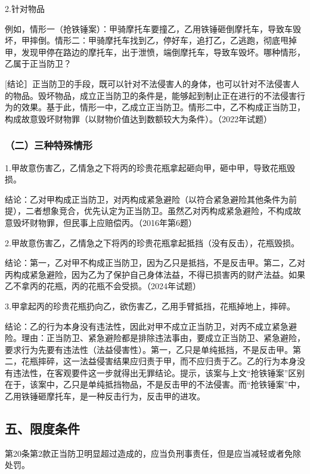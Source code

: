 2.针对物品

例如，情形一（抢铁锤案）：甲骑摩托车要撞乙，乙用铁锤砸倒摩托车，导致车毁坏，甲摔倒。情形二：甲骑摩托车找到乙，停好车，追打乙，乙逃跑，彻底甩掉甲，发现甲停在路边的摩托车，出于泄愤，端倒摩托车，导致车毁坏。哪种情形，乙属于正当防卫？

[结论］正当防卫的手段，既可以针对不法侵害人的身体，也可以针对不法侵害人的物品。毁坏物品，成立正当防卫的条件是，能够起到制止正在进行的不法侵害行为的效果。基于此，情形一中，乙成立正当防卫。情形二中，乙不构成正当防卫，构成故意毁坏财物罪（以财物价值达到数额较大为条件）。（2022年试题）

\subsubsection*{（二）三种特殊情形}

1.甲故意伤害乙，乙情急之下将丙的珍贵花瓶拿起砸向甲，砸中甲，导致花瓶毁损。

结论：乙对甲构成正当防卫，对丙构成紧急避险（以符合紧急避险其他条件为前提），二者想象竞合，优先认定为正当防卫。虽然乙对丙构成紧急避险，不构成故意毁坏财物罪，但民事上应赔偿丙。（2016年第6题）

2.甲故意伤害乙，乙情急之下将丙的珍贵花瓶拿起抵挡（没有反击），花瓶毁损。

结论：第一，乙对甲不构成正当防卫，因为乙只是抵挡，不是反击甲。第二，乙对丙构成紧急避险，因为乙为了保护自己身体法益，不得已损害丙的财产法益。如果乙不拿丙的花瓶，丙的花瓶不会受损。（2024年试题）

3.甲拿起丙的珍贵花瓶扔向乙，欲伤害乙，乙用手臂抵挡，花瓶掉地上，摔碎。

结论：乙的行为本身没有违法性，因此对甲不成立正当防卫，对丙不成立紧急避险。理由：正当防卫、紧急避险都是排除违法事由，要成立正当防卫、紧急避险，要求行为先要有违法性（法益侵害性）。第一，乙只是单纯抵挡，不是反击甲。第二，花瓶摔碎，这一法益侵害结果应归责于甲，而不应归责于乙。乙的行为本身没有违法性，在客观要件这一步就得出无罪结论。提示，该案与上文“抢铁锤案”区别在于，该案中，乙只是单纯抵挡物品，不是反击甲的不法侵害。而“抢铁锤案”中，乙用铁锤砸摩托车，是一种反击行为，反击甲的进攻。

\subsection*{五、限度条件}

第20条第2款正当防卫明显超过造成的，应当负刑事责任，但是应当减轻或者免除处罚。

